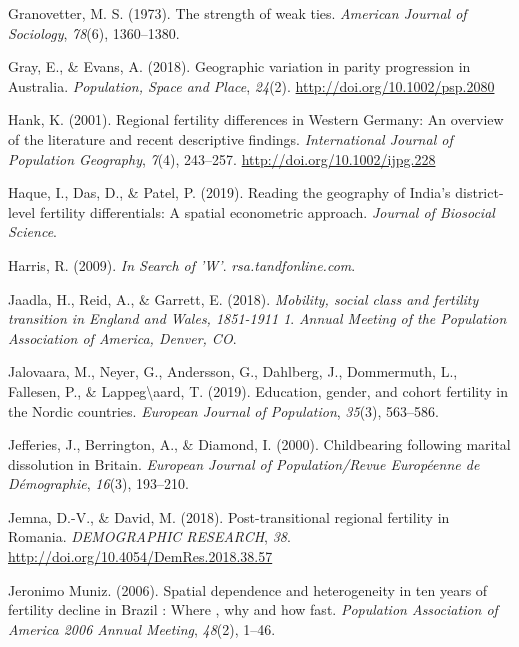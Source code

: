 \documentclass[12pt,twoside]{reedthesis}
\begin{document}
\leavevmode\hypertarget{ref-granovetter1973}{}%
Granovetter, M. S. (1973). The strength of weak ties. \emph{American Journal of Sociology}, \emph{78}(6), 1360--1380.

\leavevmode\hypertarget{ref-gray2018}{}%
Gray, E., \& Evans, A. (2018). Geographic variation in parity progression in Australia. \emph{Population, Space and Place}, \emph{24}(2). \url{http://doi.org/10.1002/psp.2080}

\leavevmode\hypertarget{ref-hank2001}{}%
Hank, K. (2001). Regional fertility differences in Western Germany: An overview of the literature and recent descriptive findings. \emph{International Journal of Population Geography}, \emph{7}(4), 243--257. \url{http://doi.org/10.1002/ijpg.228}

\leavevmode\hypertarget{ref-haque2019}{}%
Haque, I., Das, D., \& Patel, P. (2019). Reading the geography of India's district-level fertility differentials: A spatial econometric approach. \emph{Journal of Biosocial Science}.

\leavevmode\hypertarget{ref-harris2009}{}%
Harris, R. (2009). \emph{In Search of 'W'}. \emph{rsa.tandfonline.com}.

\leavevmode\hypertarget{ref-jaadla2018}{}%
Jaadla, H., Reid, A., \& Garrett, E. (2018). \emph{Mobility, social class and fertility transition in England and Wales, 1851-1911 1}. \emph{Annual Meeting of the Population Association of America, Denver, CO}.

\leavevmode\hypertarget{ref-jalovaara2019}{}%
Jalovaara, M., Neyer, G., Andersson, G., Dahlberg, J., Dommermuth, L., Fallesen, P., \& Lappeg\textbackslash aard, T. (2019). Education, gender, and cohort fertility in the Nordic countries. \emph{European Journal of Population}, \emph{35}(3), 563--586.

\leavevmode\hypertarget{ref-jefferies2000}{}%
Jefferies, J., Berrington, A., \& Diamond, I. (2000). Childbearing following marital dissolution in Britain. \emph{European Journal of Population/Revue Européenne de Démographie}, \emph{16}(3), 193--210.

\leavevmode\hypertarget{ref-jemna2018}{}%
Jemna, D.-V., \& David, M. (2018). Post-transitional regional fertility in Romania. \emph{DEMOGRAPHIC RESEARCH}, \emph{38}. \url{http://doi.org/10.4054/DemRes.2018.38.57}

\leavevmode\hypertarget{ref-jeronimomuniz2006}{}%
Jeronimo Muniz. (2006). Spatial dependence and heterogeneity in ten years of fertility decline in Brazil : Where , why and how fast. \emph{Population Association of America 2006 Annual Meeting}, \emph{48}(2), 1--46.
\end{document}
